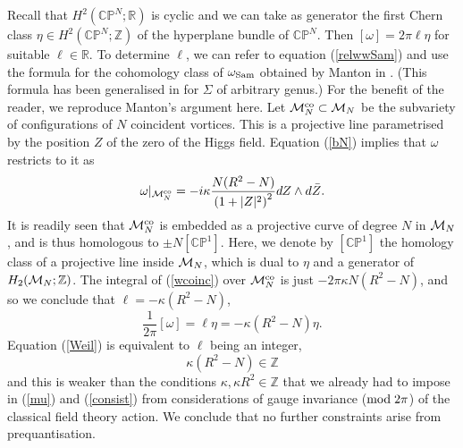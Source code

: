 \documentclass[a4paper,11pt]{article}
\begin{document}
Recall that $H^{2}(\mathbb{CP}^{N};\mathbb{R})$ is cyclic and we can
take as generator the first Chern class $\eta \in 
H^{2}(\mathbb{CP}^{N};\mathbb{Z})$ of the hyperplane bundle of 
$\mathbb{CP}^{N}$. Then $[\omega] = 2 \pi \ell \eta$ for suitable $\ell
\in \mathbb{R}$. To determine $\ell$, we can refer to equation
(\ref{relwwSam}) and use the formula for the cohomology class of 
$\omega_{\rm Sam}$ obtained by Manton in \cite{Msmv}. (This formula
has been generalised in \cite{MNvvms} for $\Sigma$ of arbitrary genus.) For
the benefit of the reader, we reproduce Manton's argument here. Let
${\cal M}_{N}^{\rm co}\subset {\cal M}_{N}$ be the subvariety of
configurations of $N$ coincident vortices. This is a projective line
parametrised by the position $Z$ of the zero of the Higgs field.
Equation (\ref{bN}) implies that $\omega$ restricts to it as
\begin{equation}\label{wcoinc}
\omega|_{{\cal M}^{\rm co}_{N}}=-i\kappa \frac{N(R^{2}-N)}
{\left(1+|Z|^{2}\right)^{2}}
dZ\wedge d\bar{Z}.
\end{equation}
It is readily seen that ${\cal M}^{\rm co}_{N}$ is embedded as a projective
curve of degree $N$ in ${\cal M}_{N}$, and is thus homologous to
$\pm N [\mathbb{CP}^{1}]$. 
Here, we denote by $[\mathbb{CP}^{1}]$ the homology class of a
projective line inside ${\cal M}_{N}$, which is dual to $\eta$ and 
a generator of $H_{2}({\cal M}_{N};\mathbb{Z})$.
The integral of (\ref{wcoinc}) over 
${\cal M}^{\rm co}_{N}$ is just $- 2 \pi \kappa N(R^{2}-N)$, and so
we conclude that $\ell=-\kappa(R^{2}-N)$,
\begin{equation} \label{ell}
\frac{1}{2\pi}[\omega]=\ell \eta=-\kappa (R^{2}-N)\eta.
\end{equation}
Equation (\ref{Weil}) is equivalent to $\ell$ being an integer,
\[
\kappa (R^{2}-N)\in \mathbb{Z}
\]
and this is weaker than the conditions 
$\kappa, \kappa R^{2}\in \mathbb{Z}$ 
that we already had to impose in (\ref{mu}) and (\ref{consist}) from 
considerations of gauge invariance (${\rm mod\;}2\pi$) of the classical 
field theory action. We conclude that no further constraints arise 
from prequantisation.
\end{document}
